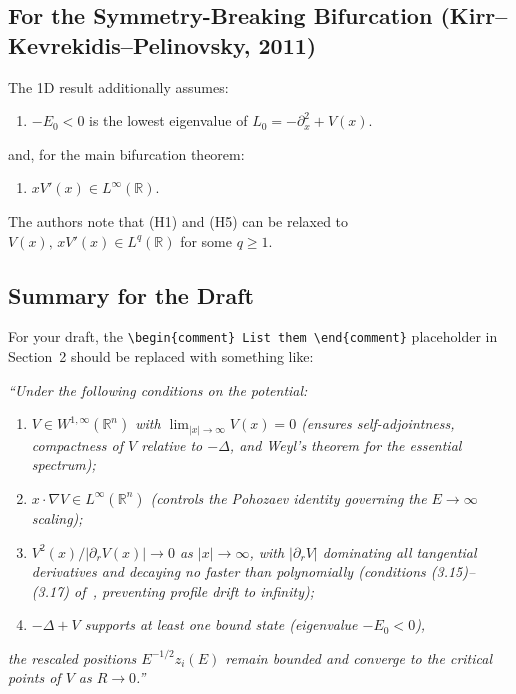 \documentclass[11pt]{article}
\begin{document}
\subsection{For the Symmetry-Breaking Bifurcation (Kirr--Kevrekidis--Pelinovsky, 2011)}

The 1D result additionally assumes:
\begin{enumerate}[label=\textbf{(H\arabic*)}, start=4]
  \item $-E_0 < 0$ is the lowest eigenvalue of $L_0 = -\partial_x^2 + V(x)$.
\end{enumerate}
and, for the main bifurcation theorem:
\begin{enumerate}[label=\textbf{(H\arabic*)}, start=5]
  \item $xV'(x) \in L^\infty(\mathbb{R})$.
\end{enumerate}
The authors note that (H1) and (H5) can be relaxed to $V(x),\, xV'(x)\in L^q(\mathbb{R})$ for some $q\geq 1$.

\subsection{Summary for the Draft}

For your draft, the \texttt{\textbackslash begin\{comment\} List them \textbackslash end\{comment\}} placeholder in Section~2 should be replaced with something like:

\medskip
\noindent\emph{``Under the following conditions on the potential:}
\begin{enumerate}[nosep,label=(\roman*)]
  \item \emph{$V\in W^{1,\infty}(\mathbb{R}^n)$ with $\lim_{|x|\to\infty}V(x) = 0$ (ensures self-adjointness, compactness of $V$ relative to $-\Delta$, and Weyl's theorem for the essential spectrum);}
  \item \emph{$x\cdot\nabla V\in L^\infty(\mathbb{R}^n)$ (controls the Pohozaev identity governing the $E\to\infty$ scaling);}
  \item \emph{$V^2(x)/|\partial_r V(x)|\to 0$ as $|x|\to\infty$, with $|\partial_r V|$ dominating all tangential derivatives and decaying no faster than polynomially (conditions (3.15)--(3.17) of~\cite{KirrNatarajan2018}, preventing profile drift to infinity);}
  \item \emph{$-\Delta+V$ supports at least one bound state (eigenvalue $-E_0 < 0$),}
\end{enumerate}
\emph{the rescaled positions $E^{-1/2}z_i(E)$ remain bounded and converge to the critical points of $V$ as $R\to 0$.''}
\end{document}

